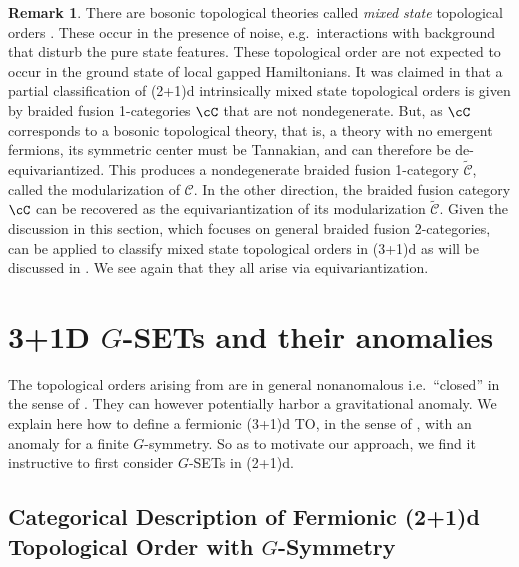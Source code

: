 \documentclass[11pt,reqno]{amsart}
\numberwithin{equation}{section}
\theoremstyle{plain}
\theoremstyle{definition}
\newtheorem{rem}[equation]{Remark}
\begin{document}
\begin{rem}
There are bosonic topological theories called \textit{mixed state} topological orders \cite{Wang:2023uoj,Ellison:2024svg,Yang:2025pke}. These occur in the presence of noise, e.g.\ interactions with background that disturb the pure state features. These topological order are not expected to occur in the ground
state of local gapped Hamiltonians. It was claimed in \cite{Sohal:2024qvq} that a partial classification of (2+1)d intrinsically mixed state topological orders is given by braided fusion 1-categories $\cC$ that are not nondegenerate. But, as $\cC$ corresponds to a bosonic topological theory, that is, a theory with no emergent fermions, its symmetric center must be Tannakian, and can therefore be de-equivariantized. This produces a nondegenerate braided fusion 1-category $\widetilde{\mathcal{C}}$, called the modularization of $\mathcal{C}$. In the other direction, the braided fusion category $\cC$ can be recovered as the equivariantization of its modularization $\widetilde{\mathcal{C}}$. Given the discussion in this section, which focuses on general braided fusion 2-categories,  can be applied to classify mixed state topological orders in (3+1)d as will be discussed in \cite{KPY}. We see again that they all arise via equivariantization.
\end{rem}

\section{3+1D $G$-SETs and their anomalies}\label{section:G-TQFTs}

The topological orders arising from  are in general nonanomalous i.e.\ ``closed'' in the sense of \cite{Kong:2014qka,kong2015boundary,kong2017boundary}. They can however potentially harbor a gravitational anomaly. We explain here how to define a fermionic (3+1)d TO, in the sense of , with an anomaly for a finite $G$-symmetry.
So as to motivate our approach, we find it instructive to first consider $G$-SETs in (2+1)d.

\subsection{Categorical Description of Fermionic (2+1)d Topological Order with $G$-Symmetry}\label{subsection:G2TQFT}
\end{document}
